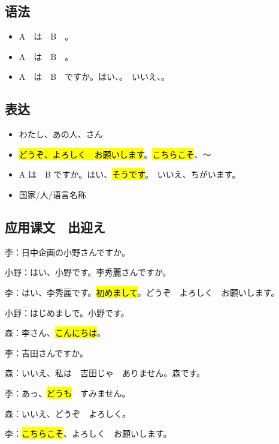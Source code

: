 \subsection{语法}

\begin{itemize}
    \item A　は　B　。
    \item A　は　B　。
    \item A　は　B　ですか。はい、。　いいえ、。
\end{itemize}

\subsection{表达}

\begin{itemize}
    \item わたし、あの人、さん
    \item \hl{どうぞ、よろしく　お願いします}。\hl{こちらこそ}、〜
    \item A は　B ですか。はい、\hl{そうです}。　いいえ、ちがいます。
    \item 国家/人/语言名称
\end{itemize}

\subsection{应用课文　出迎え}

李：日中企画の小野さんですか。

小野：はい、小野です。李秀麗さんですか。

李：はい、李秀麗です。\hl{初めまして}。どうぞ　よろしく　お願いします。

小野：はじめましで。小野です。

\vspace{1em}

森：李さん、\hl{こんにちは}。

李：吉田さんですか。

森：いいえ、私は　吉田じゃ　ありません。森です。

李：あっ、\hl{どうも}　すみません。

森：いいえ、どうぞ　よろしく。

李：\hl{こちらこそ}、よろしく　お願いします。


